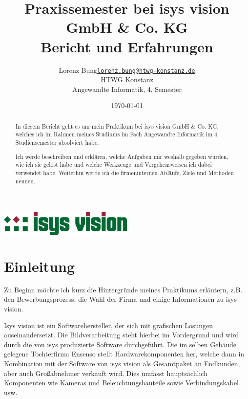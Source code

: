 \documentclass[xcolor=dvipsnames,11pt,paper=a4paper]{report}
\title{
	\Huge\textbf{Praxissemester bei isys vision GmbH \& Co. KG}\\\vspace{20pt}
	\huge{Bericht und Erfahrungen}
}
\author{
	\begin{tabular}{l l}
	Lorenz Bung &
	\href{mailto:lorenz.bung@htwg-konstanz.de}{\texttt{lorenz.bung@htwg-konstanz.de}}\\
	&HTWG Konstanz\\
	&Angewandte Informatik, 4. Semester
	\end{tabular}
}
\date{\today}
\begin{document}

\begin{titlepage}
\raggedright\includegraphics[width=0.5\textwidth]{media/isys.png}
{\let\newpage\relax\maketitle}
\end{titlepage}

\begin{abstract}
In diesem Bericht geht es um mein Praktikum bei isys vision GmbH \& Co. KG, welches
ich im Rahmen meines Studiums im Fach Angewandte Informatik im 4. Studiensemester
absolviert habe.

Ich werde beschreiben und erklären, welche Aufgaben mir weshalb gegeben wurden,
wie ich sie gelöst habe und welche Werkzeuge und Vorgehensweisen ich dabei verwendet
habe. Weiterhin werde ich die firmeninternen Abläufe, Ziele und Methoden nennen.
\end{abstract}

\tableofcontents
\pagebreak

\begingroup
\let\clearpage\relax
\lstlistoflistings
\listoffigures
\listoftables
\endgroup
\pagebreak

\setcounter{chapter}{-1}
\chapter{Einleitung}
\label{ch:0}

Zu Beginn möchte ich kurz die Hintergründe meines Praktikums erläutern,
z.B. den Bewerbungsprozess, die Wahl der Firma und einige Informationen zu isys
vision.

Isys vision ist ein Softwarehersteller, der sich mit grafischen Lösungen auseinandersetzt.
Die Bildverarbeitung steht hierbei im Vordergrund und wird durch die von isys produzierte
Software durchgeführt. Die im selben Gebäude gelegene Tochterfirma Ensenso stellt
Hardwarekomponenten her, welche dann in Kombination mit der Software von isys vision
als Gesamtpaket an Endkunden, aber auch Großabnehmer verkauft wird. Dies umfasst
hauptsächlich Komponenten wie Kameras und Beleuchtungsbauteile sowie Verbindungskabel
usw.
\end{document}
